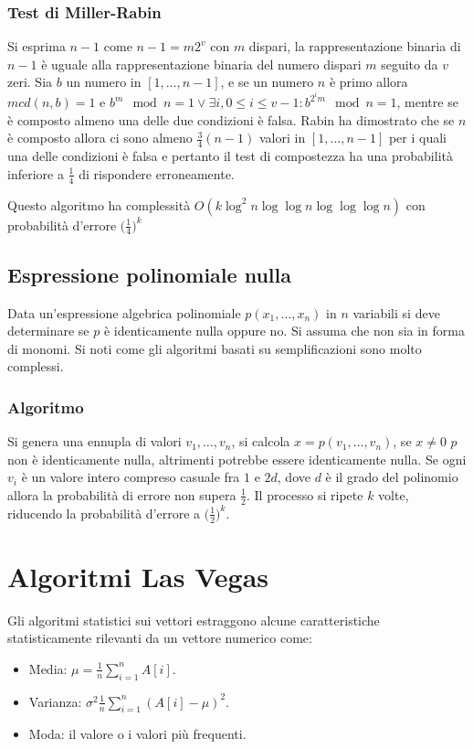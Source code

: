 \subsubsection{Test di Miller-Rabin}
Si esprima $n-1$ come $n-1 = m2^v$ con $m$ dispari, la rappresentazione binaria di $n-1$ \`e uguale alla rappresentazione binaria del numero dispari $m$ seguito da $v$ zeri. Sia $b$
un numero in $[1, \dots, n - 1]$, e se un numero $n$ \`e primo allora $mcd(n, b) = 1$ e $b^m\mod n = 1\lor \exists i, 0\le i \le v -1: b^{2^im}\mod n = 1$, mentre se \`e composto almeno
una delle due condizioni \`e falsa. Rabin ha dimostrato che se $n$ \`e composto allora ci sono almeno $\frac{3}{4}(n - 1)$ valori in $[1, \dots, n - 1]$ per i quali una delle condizioni
\`e falsa e pertanto il test di compostezza ha una probabilit\`a inferiore a $\frac{1}{4}$ di rispondere erroneamente. 

Questo algoritmo ha complessit\`a $O(k\log^2 n\log\log n\log\log\log n)$ con probabilit\`a d'errore $\bigl(\frac{1}{4}\bigr)^k$
\subsection{Espressione polinomiale nulla}
Data un'espressione algebrica polinomiale $p(x_1, \dots, x_n)$ in $n$ variabili si deve determinare se $p$ \`e identicamente nulla oppure no. Si assuma che non sia in forma di monomi. Si
noti come gli algoritmi basati su semplificazioni sono molto complessi. 
\subsubsection{Algoritmo}
Si genera una ennupla di valori $v_1, \dots, v_n$, si calcola $x = p(v_1, \dots, v_n)$, se $x\neq 0$ $p$ non \`e identicamente nulla, altrimenti potrebbe essere identicamente nulla. Se 
ogni $v_i$ \`e un valore intero compreso casuale fra $1$ e $2d$, dove $d$ \`e il grado del polinomio allora la probabilit\`a di errore non supera $\frac{1}{2}$. Il processo si ripete
$k$ volte, riducendo la probabilit\`a d'errore a $\bigl(\frac{1}{2}\bigr)^k$.
\section{Algoritmi Las Vegas}
Gli algoritmi statistici sui vettori estraggono alcune caratteristiche statisticamente rilevanti da un vettore numerico come:
\begin{itemize}
	\item Media: $\mu = \frac{1}{n}\sum\limits_{i = 1}^n A[i]$.
	\item Varianza: $\sigma^2 \frac{1}{n}\sum\limits_{i = 1}^n(A[i] - \mu)^2$.
	\item Moda: il valore o i valori pi\`u frequenti. 
\end{itemize}
